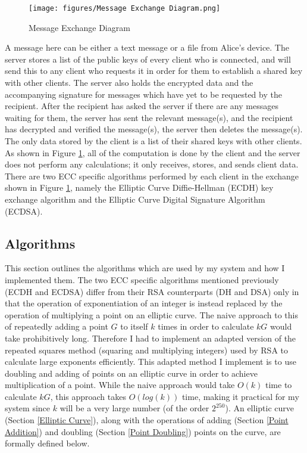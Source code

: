 \documentclass[12pt,a4paper]{article}
\begin{document}
\begin{figure}[htb]
    \centering
    \texttt{[image: figures/Message Exchange Diagram.png]}
    \caption{Message Exchange Diagram}
    \label{fig:messages}
\end{figure}

A message here can be either a text message or a file from Alice's device. 
The server stores a list of the public keys of every client who is connected, 
and will send this to any client who requests it in order for them to establish a shared key with other clients. 
The server also holds the encrypted data and the accompanying signature for messages which have yet to be requested by the recipient. 
After the recipient has asked the server if there are any messages waiting for them, the server has sent the relevant message(s), 
and the recipient has decrypted and verified the message(s), the server then deletes the message(s). 
The only data stored by the client is a list of their shared keys with other clients. 
As shown in Figure \ref{fig:messages}, all of the computation is done by the client and the server does not perform any calculations; 
it only receives, stores, and sends client data. 
There are two ECC specific algorithms performed by each client in the exchange shown in Figure \ref{fig:messages}, 
namely the Elliptic Curve Diffie-Hellman (ECDH) key exchange algorithm and the Elliptic Curve Digital Signature Algorithm (ECDSA). 

\subsection{Algorithms}\noindent \label{Algorithms}
This section outlines the algorithms which are used by my system and how I implemented them. 
The two ECC specific algorithms mentioned previously (ECDH and ECDSA) differ from their RSA counterparts (DH and DSA) only in that 
the operation of exponentiation of an integer is instead replaced by the operation of multiplying a point on an elliptic curve. 
The naive approach to this of repeatedly adding a point $G$ to itself $k$ times in order to calculate $kG$ would take prohibitively long. 
Therefore I had to implement an adapted version of the repeated squares method (squaring and multiplying integers) 
used by RSA to calculate large exponents efficiently. 
This adapted method I implement is to use doubling and adding of points on an elliptic curve in order to achieve multiplication of a point. 
While the naive approach would take $O(k)$ time to calculate $kG$, this approach takes $O(log(k))$ time, 
making it practical for my system since $k$ will be a very large number (of the order $2^{250}$). 
An elliptic curve (Section \ref{Elliptic Curve}), along with the operations of adding (Section \ref{Point Addition}) 
and doubling (Section \ref{Point Doubling}) points on the curve, are formally defined below. 
\end{document}
